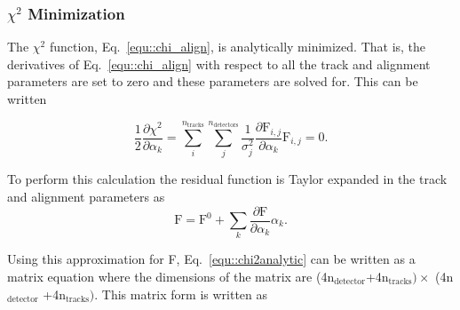 \subsubsection{$\chi^2$ Minimization}
The $\chi^2$ function, Eq.~\ref{equ::chi_align}, is analytically minimized.
That is, the derivatives of Eq.~\ref{equ::chi_align} with respect to all the
track and alignment parameters are set to zero and these parameters are solved
for.  This can be written

\begin{equation}
  \label{equ::chi2analytic}
  \frac{1}{2}\frac{\partial \chi ^2}{\partial \alpha_k} =
  \sum_{i}^{n_{\mathrm{tracks}}} \sum_j ^{n_{\mathrm{detectors}}}
  \frac{1}{\sigma_j^2}\frac{\partial \mathrm{F}_{i,j}}{\partial \alpha_k}
  \mathrm{F}_{i,j} = 0.
\end{equation}

\noindent
To perform this calculation the residual function is Taylor expanded in the
track and alignment parameters as
\begin{equation}
\mathrm{F} = \mathrm{F}^0 + \sum_k \frac{\partial \mathrm{F}}{\partial
  \alpha_k}\alpha_k.
\end{equation}

\noindent
Using this approximation for F, Eq.~\ref{equ::chi2analytic} can be written as a
matrix equation where the dimensions of the matrix are
(4n$_{\mathrm{detector}}$+4n$_{\mathrm{tracks}})\times$
(4n$_{\mathrm{detector}}$ +4n$_{\mathrm{tracks}})$.  This matrix form is written
as


